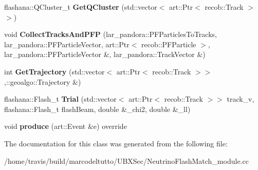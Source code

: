 \begin{DoxyCompactItemize}
\item 
\hypertarget{classNeutrinoFlashMatch_aa511b92472bb70883c5a666293be1da3}{flashana\-::\-Q\-Cluster\-\_\-t {\bfseries \-Get\-Q\-Cluster} (std\-::vector$<$ art\-::\-Ptr$<$ recob\-::\-Track $>$$>$)}\label{classNeutrinoFlashMatch_aa511b92472bb70883c5a666293be1da3}

\item 
\hypertarget{classNeutrinoFlashMatch_acb3a38a4888510ff5fe7bd761f145612}{void {\bfseries \-Collect\-Tracks\-And\-P\-F\-P} (lar\-\_\-pandora\-::\-P\-F\-Particles\-To\-Tracks, lar\-\_\-pandora\-::\-P\-F\-Particle\-Vector, art\-::\-Ptr$<$ recob\-::\-P\-F\-Particle $>$, lar\-\_\-pandora\-::\-P\-F\-Particle\-Vector \&, lar\-\_\-pandora\-::\-Track\-Vector \&)}\label{classNeutrinoFlashMatch_acb3a38a4888510ff5fe7bd761f145612}

\item 
\hypertarget{classNeutrinoFlashMatch_ad1999c7064999308fa0eb8a33e0ab642}{int {\bfseries \-Get\-Trajectory} (std\-::vector$<$ art\-::\-Ptr$<$ recob\-::\-Track $>$$>$,\-::geoalgo\-::\-Trajectory \&)}\label{classNeutrinoFlashMatch_ad1999c7064999308fa0eb8a33e0ab642}

\item 
\hypertarget{classNeutrinoFlashMatch_aa957152a8c232e4b23cc7544aa6bfdd1}{flashana\-::\-Flash\-\_\-t {\bfseries \-Trial} (std\-::vector$<$ art\-::\-Ptr$<$ recob\-::\-Track $>$$>$ track\-\_\-v, flashana\-::\-Flash\-\_\-t flash\-Beam, double \&\-\_\-chi2, double \&\-\_\-ll)}\label{classNeutrinoFlashMatch_aa957152a8c232e4b23cc7544aa6bfdd1}

\item 
\hypertarget{classNeutrinoFlashMatch_a00578af5672ff925f80c1b9482c8b4ff}{void {\bfseries produce} (art\-::\-Event \&e) override}\label{classNeutrinoFlashMatch_a00578af5672ff925f80c1b9482c8b4ff}

\end{DoxyCompactItemize}


\-The documentation for this class was generated from the following file\-:\begin{DoxyCompactItemize}
\item 
/home/travis/build/marcodeltutto/\-U\-B\-X\-Sec/\-Neutrino\-Flash\-Match\-\_\-module.\-cc\end{DoxyCompactItemize}
